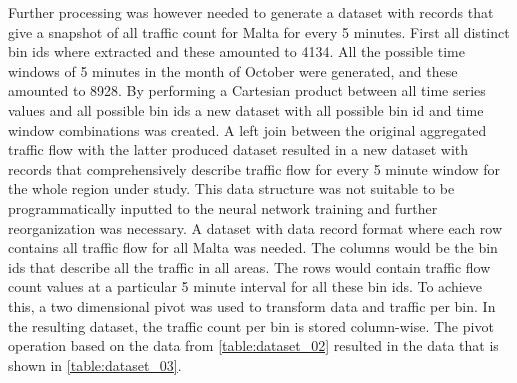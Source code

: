 \documentclass[12pt, a4paper]{report}
\theoremstyle{definition}
\theoremstyle{definition}%
\theoremstyle{definition}%
\theoremstyle{definition}%
\theoremstyle{definition}%
\theoremstyle{definition}%
\begin{document}
Further processing was however needed to generate a dataset with records that give a snapshot of all traffic count for Malta for every 5 minutes. First all distinct bin ids where extracted and these amounted to 4134. All the possible time windows of 5 minutes in the month of October were generated, and these amounted to 8928. By performing a Cartesian product between all time series values and all possible bin ids a new dataset with all possible bin id and time window combinations was created. A left join between the original aggregated traffic flow with the latter produced dataset resulted in a new dataset with records that comprehensively describe traffic flow for every 5 minute window for the whole region under study. This data structure was not suitable to be programmatically inputted to the neural network training and further reorganization was necessary. A dataset with data record format where each row contains all traffic flow for all Malta was needed. The columns would be the bin ids that describe all the traffic in all areas. The rows would contain traffic flow count values at a particular 5 minute interval for all these bin ids. To achieve this, a two dimensional pivot was used to transform data and traffic per bin. In the resulting dataset, the traffic count per bin is stored column-wise. The pivot operation based on the data from \ref{table:dataset_02}  resulted in the data that is shown in \ref{table:dataset_03}. 


\begin{table}[h]	
	\centering
	\caption{Sparse traffic flow matrix} 
	\label{table:dataset_03}
\end{table}
\end{document}
